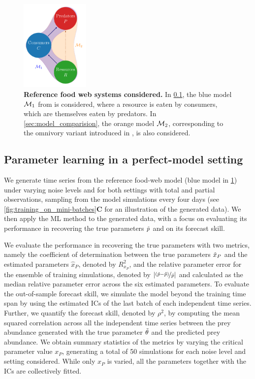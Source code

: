 \begin{figure}[ht]
    \centering
    \includegraphics[width=0.3\textwidth]{figures/figure2.pdf}
    \caption{\textbf{Reference food web systems considered.} In \cref{sec:perfect-model}, the blue model $\mathcal{M}_1$ from \citep{Hastings1991} is considered, where a resource is eaten by consumers, which are themselves eaten by predators. In \cref{sec:model_comparision}, the orange model $\mathcal{M}_2$, corresponding to the omnivory variant introduced in \citep{McCann1997}, is also considered.}
    \label{fig:3species_foodchain_simple}
\end{figure}
\FloatBarrier

\subsection{Parameter learning in a perfect-model setting}\label{sec:perfect-model}

We generate time series from the reference food-web model (blue model in \cref{fig:3species_foodchain_simple}) under varying noise levels and for both settings with total and partial observations, sampling from the model simulations every four days (see \cref{fig:training_on_mini-batches}\textbf{C} for an illustration of the generated data).
%
We then apply the ML method to the generated data, with a focus on evaluating its performance in recovering the true parameters $\Tilde{p}$ and on its forecast skill.

We evaluate the performance in recovering the true parameters with two metrics, namely the coefficient of determination between the true parameters $\Tilde x_P$ and the estimated parameters $\hat x_P$, denoted by $R^2_{x_P}$, and the relative parameter error for the ensemble of training simulations, denoted by $|\nicefrac{(\hat p -\Tilde{p})}{\Tilde{p}}|$ and calculated as the median relative parameter error across the six estimated parameters.
%
To evaluate the out-of-sample forecast skill, we simulate the model beyond the training time span by using the estimated ICs of the last batch of each independent time series. Further, we quantify the forecast skill, denoted by $\rho^2$, by computing the mean squared correlation across all the independent time series between the prey abundance generated with the true parameter $\Tilde{\theta}$ and the predicted prey abundance.
% 
We obtain summary statistics of the metrics by varying the critical parameter value $x_P$, generating a total of 50 simulations for each noise level and setting considered.  While only $x_P$ is varied, all the parameters together with the ICs are collectively fitted. 

